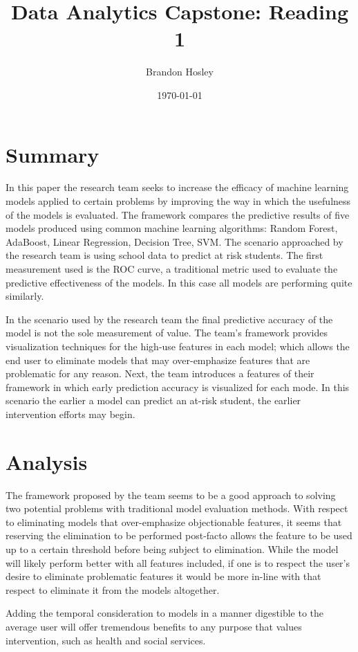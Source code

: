 \documentclass[]{article}
\title{Data Analytics Capstone: Reading 1}
\author{Brandon Hosley}
\date{\today}
\begin{document}
	\maketitle
	
\section{Summary} 

In this paper \cite{Lakkaraju2015} the research team seeks to increase the efficacy of machine learning models applied to certain problems by improving the way in which the usefulness of the models is evaluated. 
The framework compares the predictive results of five models produced using common machine learning algorithms: Random Forest, AdaBoost, Linear Regression, Decision Tree, SVM.
The scenario approached by the research team is using school data to predict at risk students.
The first measurement used is the ROC curve, a traditional metric used to evaluate the predictive effectiveness of the models.
In this case all models are performing quite similarly.

In the scenario used by the research team the final predictive accuracy of the model is not the sole measurement of value.
The team's framework provides visualization techniques for the high-use features in each model;
which allows the end user to eliminate models that may over-emphasize features that are problematic for any reason.
Next, the team introduces a features of their framework in which early prediction accuracy is visualized for each mode.
In this scenario the earlier a model can predict an at-risk student, the earlier intervention efforts may begin.

\section{Analysis}

The framework proposed by the team seems to be a good approach to solving two potential problems with traditional model evaluation methods.
With respect to eliminating models that over-emphasize objectionable features, it seems that reserving the elimination to be performed post-facto allows the feature to be used up to a certain threshold before being subject to elimination.
While the model will likely perform better with all features included, if one is to respect the user's desire to eliminate problematic features it would be more in-line with that respect to eliminate it from the models altogether.

Adding the temporal consideration to models in a manner digestible to the average user will offer tremendous benefits to any purpose that values intervention, such as health and social services.

\clearpage


\end{document}
